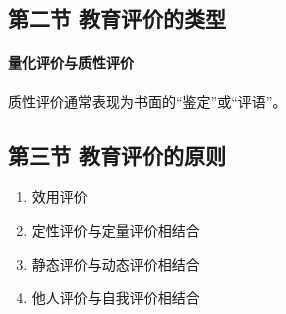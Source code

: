\documentclass[b5paper,11pt]{article}
\begin{document}
\subsection{第二节 \space 教育评价的类型}
\paragraph{量化评价与质性评价} 质性评价通常表现为书面的“鉴定”或“评语”。

\subsection{第三节 \space 教育评价的原则}
\begin{enumerate}
  \item 效用评价
  \item 定性评价与定量评价相结合
  \item 静态评价与动态评价相结合
  \item 他人评价与自我评价相结合
\end{enumerate}
\end{document}
